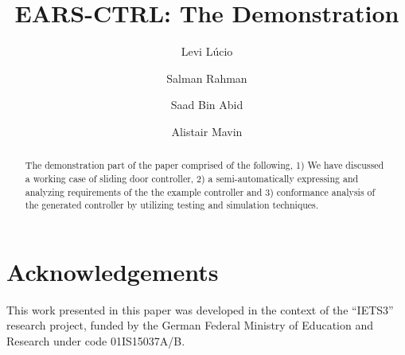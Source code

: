 \documentclass{llncs}
\begin{document}
%
\frontmatter          %

\mainmatter              %
%
\title{EARS-CTRL: The Demonstration}
%
\titlerunning{}  %
%
\author{Levi L\'ucio \and Salman Rahman
 \and Saad Bin Abid \and Alistair Mavin}
%
\authorrunning{} %
%
\tocauthor{}
%

\maketitle              %

\begin{abstract}
The demonstration part of the paper comprised of the following, 1) We have
discussed a working case of sliding door controller, 2) a semi-automatically
expressing and analyzing requirements of the the example controller and 3)
conformance analysis of the generated controller by utilizing testing and simulation techniques.
\end{abstract}







\section*{Acknowledgements}
This work presented in this paper was developed in the context of the
``IETS3'' research project, funded by the German Federal Ministry of Education
and Research under code 01IS15037A/B.



\end{document}
